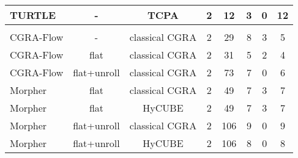 \begin{table}
{\begin{tabular}{|l|c|c|c|c|c|c|c|}
 {TURTLE}                                               & {-}                                  & TCPA                               & 2                              & 12                            & 3                          & 0                                   & 12 \\ \hline\hline
 \rowcolor{darkGray} \multicolumn{8}{|c|}{\color{white}{\textbf{MVT}}} \\\hline
 {CGRA-Flow}                                          & -                                    & classical CGRA                            & 2                              & 29                            & 8                          & 3                                   & 5 \\ 
 {CGRA-Flow}                                          & flat                                 & classical CGRA                            & 2                              & 31                            & 5                          & 2                                   & 4 \\
 {CGRA-Flow}                                          & flat+unroll                          & classical CGRA                            & 2                              & 73                            & 7                          & 0                                   & 6 \\
 {Morpher}                                            & {flat}                               & classical CGRA                            & 2                              & 49                            & 7                          & 3                                   & 7 \\ 
 {Morpher}                                            & {flat}                               & HyCUBE                               & 2                              & 49                            & 7                          & 3                                   & 7\\ 
 {Morpher}                                            & {flat+unroll}                        & classical CGRA                            & 2                              & 106                           & 9                          & 0                                   & 9 \\ 
 {Morpher}                                            & {flat+unroll}                        & HyCUBE                               & 2                              & 106                           & 8                          & 0                                   & 8 \\ 

\end{tabular}}
\end{table}
